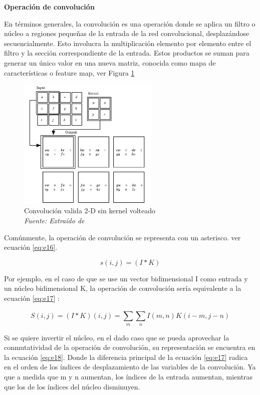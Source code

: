 \textbf{Operación de convolución}

En términos generales, la convolución es una operación donde se  aplica un filtro o núcleo a regiones pequeñas de la entrada de la red convolucional, desplazándose secuencialmente. Esto involucra la multiplicación elemento por elemento entre el filtro y la sección correspondiente de la entrada. Estos productos se suman para generar un único valor en una nueva matriz, conocida como mapa de características o feature map, ver Figura \ref{fig:an10}

\begin{figure}[h!]
	\includegraphics[width=0.6\textwidth]{capitulo2/figuras/an10.png}
	\caption[Convolución valida 2-D sin kernel volteado]{Convolución valida 2-D sin kernel volteado
		\\\textit{Fuente: Extraído de} \protect\cite[p. 334]{goodfellow2016deep}}
	\label{fig:an10}
\end{figure}

Comúnmente, la operación de convolución se representa con un asterisco. ver ecuación \ref{eq:e16}.

\begin{equation} \label{eq:e16} 
	s(i,j)=(I\ast K)
\end{equation}

Por ejemplo, en el caso de que se use un vector bidimensional I como entrada y un núcleo bidimensional K, la operación de convolución sería equivalente a la ecuación \ref{eq:e17} :

\begin{equation} \label{eq:e17} 
	S(i,j)=(I\ast K)(i,j)=\sum_{m}^{}\sum_{n}^{}I(m,n)K(i-m,j-n)
\end{equation}

Si se quiere invertir el núcleo, en el dado caso que se pueda aprovechar la conmutatividad de la operación de convolución, su representación se encuentra en la ecuación \ref{eq:e18}. Donde la  diferencia principal de la ecuación \ref{eq:e17} radica en el orden de los índices de desplazamiento de las variables de la convolución. Ya que a medida que m y n aumentan, los índices de la entrada aumentan, mientras que los de los índices del núcleo disminuyen.

